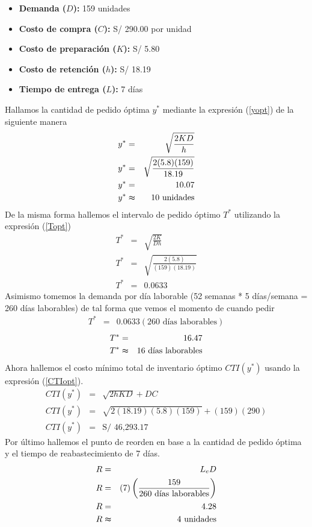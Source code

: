 \begin{itemize}
    \item \textbf{Demanda ($D$):} 159 unidades
    \item \textbf{Costo de compra ($C$):} S/ 290.00 por unidad
    \item \textbf{Costo de preparación ($K$):} S/ 5.80
    \item \textbf{Costo de retención ($h$):} S/ 18.19
    \item \textbf{Tiempo de entrega ($L$):} 7 días
\end{itemize}

Hallamos la cantidad de pedido óptima $y^*$ mediante la expresión (\ref{yopt}) de la siguiente manera
\begin{eqnarray}
    y^* &=& \sqrt{\frac{2KD}{h}} \nonumber \\
    y^* &=& \sqrt{\frac{2(5.8)(159)}{18.19}} \nonumber \\
    y^* &=& 10.07 \nonumber \\
    y^* &\thickapprox& 10 \text{ unidades} \nonumber
\end{eqnarray}
De la misma forma hallemos el intervalo de pedido óptimo $T^*$ utilizando la expresión (\ref{Topt}) 
\begin{eqnarray}
    T^* &=& \sqrt{\frac{2K}{Dh}} \nonumber \\
    T^* &=& \sqrt{\frac{2(5.8)}{(159)(18.19)}} \nonumber \\
    T^* &=& 0.0633 \nonumber
\end{eqnarray}
Asimismo tomemos la demanda por día laborable (52 semanas * 5 días/semana = 260 días laborables) de tal forma que vemos el momento de cuando pedir
\begin{eqnarray}
    T^* &=& 0.0633 (260 \text{ días laborables}) \nonumber
\end{eqnarray}
\begin{eqnarray}
    T^* &=& 16.47 \nonumber \\
    T^* &\thickapprox& 16 \text{ días laborables} \nonumber
\end{eqnarray}
Ahora hallemos el costo mínimo total de inventario óptimo $CTI(y^*)$ usando la expresión (\ref{CTIopt}).
\begin{eqnarray}
    CTI(y^*) &=& \sqrt{2hKD} + DC \nonumber \\
    CTI(y^*) &=& \sqrt{2(18.19)(5.8)(159)} + (159)(290) \nonumber \\
    CTI(y^*) &=& \text{S/ 46,293.17} \nonumber
\end{eqnarray}
Por último hallemos el punto de reorden en base a la cantidad de pedido óptima y el tiempo de reabastecimiento de 7 días.
\begin{eqnarray}
    R &=& L_e D \nonumber \\
    R &=& (7) \left(\frac{159}{260 \text{ días laborables}} \right) \nonumber \\
    R &=& 4.28 \nonumber \\
    R &\thickapprox& 4 \text{ unidades} \nonumber
\end{eqnarray}

